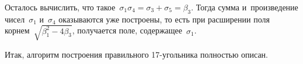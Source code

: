 \documentclass{article}
\begin{document}
Осталось вычислить, что такое~$\sigma_1 \sigma_4 = \sigma_3 + \sigma_5 =
\beta_3$. Тогда сумма и~произведение чисел~$\sigma_1$ и~$\sigma_4$ оказываются
уже построены, то есть при расширении поля корнем~$\sqrt{\beta_1^2 - 4\beta_3}$,
получается поле, содержащее~$\sigma_1$.

Итак, алгоритм построения правильного 17-угольника полностью описан.
\end{document}
